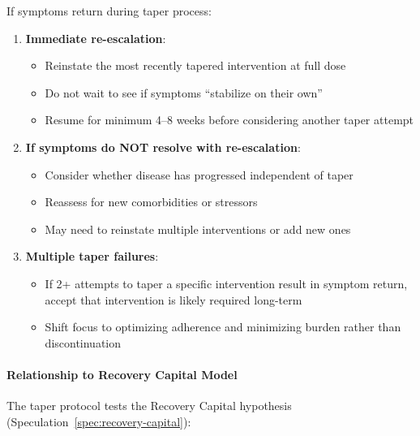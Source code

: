 \begin{warning}
If symptoms return during taper process:

\begin{enumerate}
    \item \textbf{Immediate re-escalation}:
    \begin{itemize}
        \item Reinstate the most recently tapered intervention at full dose
        \item Do not wait to see if symptoms ``stabilize on their own''
        \item Resume for minimum 4--8 weeks before considering another taper attempt
    \end{itemize}

    \item \textbf{If symptoms do NOT resolve with re-escalation}:
    \begin{itemize}
        \item Consider whether disease has progressed independent of taper
        \item Reassess for new comorbidities or stressors
        \item May need to reinstate multiple interventions or add new ones
    \end{itemize}

    \item \textbf{Multiple taper failures}:
    \begin{itemize}
        \item If 2+ attempts to taper a specific intervention result in symptom return, accept that intervention is likely required long-term
        \item Shift focus to optimizing adherence and minimizing burden rather than discontinuation
    \end{itemize}
\end{enumerate}
\end{warning}

\paragraph{Relationship to Recovery Capital Model}

The taper protocol tests the Recovery Capital hypothesis (Speculation~\ref{spec:recovery-capital}):

